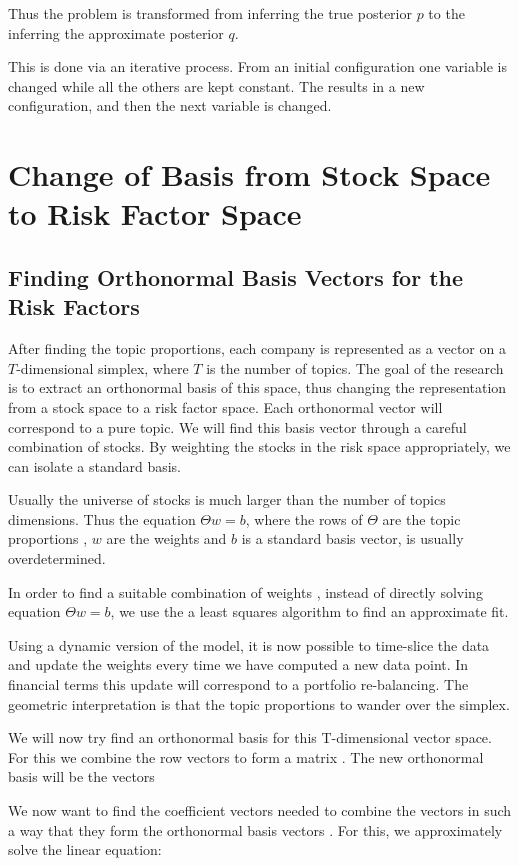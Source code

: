 \documentclass[12pt,journal,letterpaper,oneside,onecolumn]{IEEEtran}
\begin{document}
Thus the problem is transformed from inferring the true posterior $p$ to the inferring the approximate posterior $q$.

This is done via an iterative process.
From an initial configuration one variable is changed while all the others are kept constant. The results in a new configuration, and then the next variable is changed. 


\section{Change of Basis from Stock Space to Risk Factor Space }

\subsection{Finding Orthonormal Basis Vectors for the Risk Factors}

After finding the topic proportions, each company is represented as a vector on a $T$-dimensional simplex, where $T$ is the number of topics.
The goal of the research is to extract an orthonormal basis of this space, thus changing the representation from a stock space to a risk factor space.
Each orthonormal vector will correspond to a pure topic.
We will find this basis vector through a careful combination of stocks. By weighting the stocks in the risk space appropriately, we can isolate a standard basis.

Usually the universe of stocks is much larger than the number of topics dimensions. Thus the equation $\Theta w = b$, where the rows of $\Theta$ are the topic proportions  , $w$ are the weights and $b$ is a standard basis vector, is usually overdetermined.

In order to find a suitable combination of weights , instead of directly solving equation $\Theta w = b$, we use the a least squares algorithm to find an approximate fit.

Using a dynamic version of the model, it is now possible to time-slice the data and update the weights every time we have computed a new data point. In financial terms this update will correspond to a portfolio re-balancing.
The geometric interpretation is that the topic proportions to wander over the simplex.

We will now try find an orthonormal basis for this T-dimensional vector space.
For this we combine the  row vectors to form a matrix .
The new orthonormal basis will be the vectors 

We now want to find the coefficient vectors  needed to combine the vectors in such a way that they form the orthonormal basis vectors .
For this, we approximately solve the linear equation:
\end{document}
